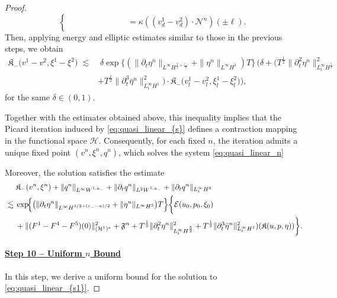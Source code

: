 \documentclass[letterpaper,reqno,10pt,twoside]{amsart}
\theoremstyle{definition}
\theoremstyle{remark}
\def\p{\partial}
\begin{document}
\begin{proof}
{\[\begin{cases}
				\quad\quad\quad\quad\quad\quad\quad=\kappa ((v_{d}^{1}-v_{d}^{2})\cdot \mathcal{N}^{n})(\pm \ell).
			\end{cases}
			\]
			Then, applying energy and elliptic estimates similar to those in the previous steps, we obtain
			\[
			\begin{aligned}
				\mathfrak{K}_{-}\bigl(
				v^{1}-v^{2},
				\xi^{1}-\xi^{2}
				\bigr)
				\;\lesssim&\;
				\delta\exp\{(\|\p_{t}\eta^{n}\|_{L^{\infty}H^{\frac{3}{2}+\frac{\varepsilon_{-}}{2}}}+\|\eta^{n}\|_{L^{\infty}H^{3}})T\}\,
				\bigg(\delta+(T^{\frac{1}{2}}\|\p_{t}^{2}\eta^{n}\|^{2}_{L_{t}^{\infty}H^{\frac{5}{2}}}\\
				& +T^{\frac{1}{2}}\|\p_{t}^{3}\bar{\eta}^{n}\|_{L_{t}^{\infty}H^{1}}^{2}) \cdot \mathfrak{K}_{-}\bigl(
				v_{l}^{1}-v_{l}^{2},
				\xi_{l}^{1}-\xi_{l}^{2}
				\bigr)\bigg),
			\end{aligned}
			\]
			for the same $\delta\in(0,1)$.
			
			Together with the estimates obtained above, this inequality implies that the
			Picard iteration induced by \eqref{eq:quasi_linear_{s}} defines a contraction
			mapping in the functional space $\mathscr{H}$. Consequently, for each fixed $n$, the iteration admits a unique fixed
			point $(v^{n},\xi^{n},q^{n})$, which solves the system \eqref{eq:quasi_linear_n}
			
			Moreover, the solution satisfies the estimate
			\[
			\begin{aligned}
				&\mathfrak{K}_{-}(v^{n},\xi^{n})+\|q^{n}\|_{L^{\infty}W^{1,q_{-}}}+\|\p_{t}q^{n}\|_{L^{2}W^{1,q_{-}}}+\|\p_{t}q^{n}\|_{L_{t}^{\infty}H^{0}}
				\\
				\;\lesssim\;&
				\exp\!\Bigl\{
				\bigl(
				\|\partial_{t}\eta^{n}\|_{L^{\infty}H^{3/2+(\varepsilon_{-}-\alpha)/2}}
				+\|\eta^{n}\|_{L^{\infty}H^{3}}
				\bigr)T
				\Bigr\}\bigg\{ \mathcal{E}(u_{0},p_{0},\xi_{0}) \\
				&+\|(F^1-F^4-F^5)(0)\|^{2}_{(\mathcal{H}^1)^\ast}+\mathfrak{F}^{n}+T^{\frac{1}{2}}\|\p_{t}^{2}\eta^{n}\|^{2}_{L_{t}^{\infty}H^{\frac{5}{2}}}+T^{\frac{1}{2}}\|\p_{t}^{3}\bar{\eta}^{n}\|_{L_{t}^{\infty}H^{1}}^{2})(\mathfrak{K}(u,p,\eta))\bigg\}
				.
			\end{aligned}
			\]
			
			\paragraph{\underline{Step 10 -- Uniform $n$ Bound}}
			In this step, we derive a uniform bound for the solution to \eqref{eq:quasi_linear_{s1}}.
			
}
\end{proof}
\end{document}
